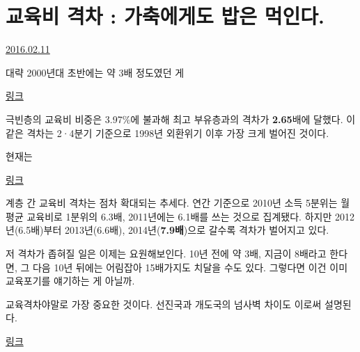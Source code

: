 \section{교육비 격차 : 가축에게도 밥은 먹인다.}
\href{https://www.kockoc.com/Apoc/630883}{2016.02.11}

\vspace{5mm}

대략 2000년대 초반에는 약 3배 정도였던 게
\vspace{5mm}

\href{http://www.eduict.org/$\_$new3/?c=3/51&p=2&uid=22038}{링크}
\vspace{5mm}

극빈층의 교육비 비중은 3.97$\%$에 불과해 최고 부유층과의 격차가 \textbf{2.65}배에 달했다. 이같은 격차는 2·4분기 기준으로 1998년 외환위기 이후 가장 크게 벌어진 것이다.
\vspace{5mm}

현재는
\vspace{5mm}

\href{http://news.naver.com/main/read.nhn?mode=LSD&mid=sec&sid1=102&oid=020&aid=0002943121}{링크}
\vspace{5mm}

계층 간 교육비 격차는 점차 확대되는 추세다. 연간 기준으로 2010년 소득 5분위는 월평균 교육비로 1분위의 6.3배, 2011년에는 6.1배를 쓰는 것으로 집계됐다. 하지만 2012년(6.5배)부터 2013년(6.6배), 2014년(\textbf{7.9배})으로 갈수록 격차가 벌어지고 있다.
\vspace{5mm}

저 격차가 좁혀질 일은 이제는 요원해보인다.
10년 전에 약 3배, 지금이 8배라고 한다면, 그 다음 10년 뒤에는 어림잡아 15배가지도 치달을 수도 있다.
그렇다면 이건 이미 교육포기를 얘기하는 게 아닐까.
\vspace{5mm}

교육격차야말로 가장 중요한 것이다.
선진국과 개도국의 넘사벽 차이도 이로써 설명된다.
\vspace{5mm}

\href{http://news.naver.com/main/read.nhn?mode=LSD&mid=sec&sid1=104&oid=005&aid=0000766838}{링크}
\vspace{5mm}

